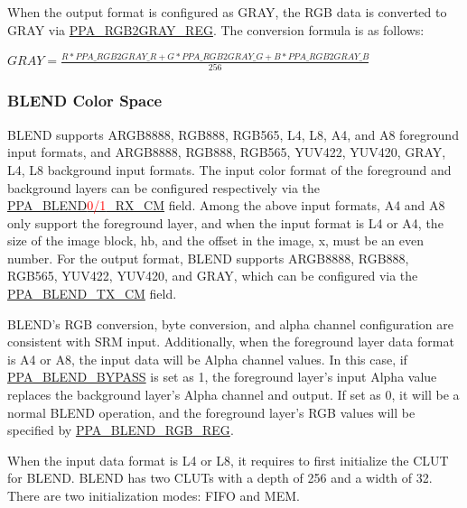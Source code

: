 \documentclass[main\_\_EN.tex]{subfiles}
\begin{document}
When the output format is configured as GRAY, the RGB data is converted to GRAY via \hyperref[regdesc:PPARGB2GRAYREG]{PPA\_RGB2GRAY\_REG}. The conversion formula is as follows:

$GRAY = \frac{R * \hyperref[fielddesc:PPARGB2GRAYR]{PPA\_RGB2GRAY\_R} + G * \hyperref[fielddesc:PPARGB2GRAYG]{PPA\_RGB2GRAY\_G} + B * \hyperref[fielddesc:PPARGB2GRAYB]{PPA\_RGB2GRAY\_B}}{256}$


\subsubsection{BLEND Color Space}
\label{sec:blend-color-space}

BLEND supports ARGB8888, RGB888, RGB565, L4, L8, A4, and A8 foreground input formats, and ARGB8888, RGB888, RGB565, YUV422, YUV420, GRAY, L4, L8 background input formats. The input color format of the foreground and background layers can be configured respectively via the \hyperref[fielddesc:PPABLEND0RXCM]{PPA\_BLEND\textcolor{red}{0/1}\_RX\_CM} field. Among the above input formats, A4 and A8 only support the foreground layer, and when the input format is L4 or A4, the size of the image block, hb, and the offset in the image, x, must be an even number. For the output format, BLEND supports ARGB8888, RGB888, RGB565, YUV422, YUV420, and GRAY, which can be configured via the \hyperref[fielddesc:PPABLENDTXCM]{PPA\_BLEND\_TX\_CM} field.

BLEND's RGB conversion, byte conversion, and alpha channel configuration are consistent with SRM input. Additionally, when the foreground layer data format is A4 or A8, the input data will be Alpha channel values. In this case, if \hyperref[fielddesc:PPABLENDBYPASS]{PPA\_BLEND\_BYPASS} is set as 1, the foreground layer's input Alpha value replaces the background layer's Alpha channel and output. If set as 0, it will be a normal BLEND operation, and the foreground layer's RGB values will be specified by \hyperref[regdesc:PPABLENDRGBREG]{PPA\_BLEND\_RGB\_REG}.

When the input data format is L4 or L8, it requires to first initialize the CLUT for BLEND. BLEND has two CLUTs with a depth of 256 and a width of 32. There are two initialization modes: FIFO and MEM.
\end{document}

